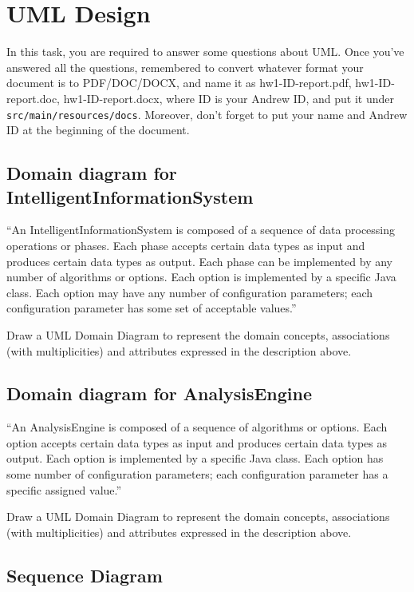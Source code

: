 
\chapter{UML Design}

In this task, you are required to answer some questions about UML. Once you've
answered all the questions, remembered to convert whatever format your document
is to PDF/DOC/DOCX, and name it as hw1-ID-report.pdf, hw1-ID-report.doc,
hw1-ID-report.docx, where ID is your Andrew ID, and put it under
\texttt{src/main/resources/docs}. Moreover, don't forget to put your name and
Andrew ID at the beginning of the document.

\section{Domain diagram for IntelligentInformationSystem}

``An IntelligentInformationSystem is composed of a sequence of data processing
operations or phases. Each phase accepts certain data types as input and
produces certain data types as output. Each phase can be implemented by any
number of algorithms or options. Each option is implemented by a specific Java
class. Each option may have any number of configuration parameters; each
configuration parameter has some set of acceptable values.''

Draw a UML Domain Diagram to represent the domain concepts, associations (with
multiplicities) and attributes expressed in the description above.

\section{Domain diagram for AnalysisEngine}

``An AnalysisEngine is composed of a sequence of algorithms or options. Each
option accepts certain data types as input and produces certain data types as
output. Each option is implemented by a specific Java class. Each option has
some number of configuration parameters; each configuration parameter has a
specific assigned value.''

Draw a UML Domain Diagram to represent the domain concepts, associations (with
multiplicities) and attributes expressed in the description above.

\section{Sequence Diagram}


